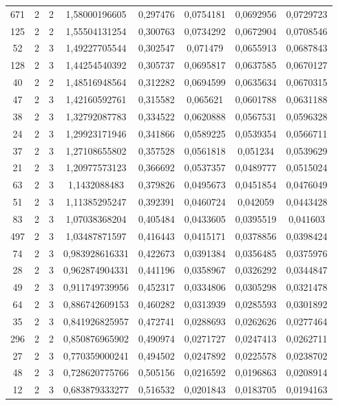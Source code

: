 \begin{longtable}{|c|c|c|c|c|c|c|c|}
671 & 2 & 2 & 1,58000196605 & 0,297476 & 0,0754181 & 0,0692956 & 0,0729723 \\
125 & 2 & 2 & 1,55504131254 & 0,300763 & 0,0734292 & 0,0672904 & 0,0708546 \\
52 & 2 & 3 & 1,49227705544 & 0,302547 & 0,071479 & 0,0655913 & 0,0687843 \\
128 & 2 & 3 & 1,44254540392 & 0,305737 & 0,0695817 & 0,0637585 & 0,0670127 \\
40 & 2 & 2 & 1,48516948564 & 0,312282 & 0,0694599 & 0,0635634 & 0,0670315 \\
47 & 2 & 3 & 1,42160592761 & 0,315582 & 0,065621 & 0,0601788 & 0,0631188 \\
38 & 2 & 3 & 1,32792087783 & 0,334522 & 0,0620888 & 0,0567531 & 0,0596328 \\
24 & 2 & 3 & 1,29923171946 & 0,341866 & 0,0589225 & 0,0539354 & 0,0566711 \\
37 & 2 & 3 & 1,27108655802 & 0,357528 & 0,0561818 & 0,051234 & 0,0539629 \\
21 & 2 & 3 & 1,20977573123 & 0,366692 & 0,0537357 & 0,0489777 & 0,0515024 \\
63 & 2 & 3 & 1,1432088483 & 0,379826 & 0,0495673 & 0,0451854 & 0,0476049 \\
51 & 2 & 3 & 1,11385295247 & 0,392391 & 0,0460724 & 0,042059 & 0,0443428 \\
83 & 2 & 3 & 1,07038368204 & 0,405484 & 0,0433605 & 0,0395519 & 0,041603 \\
497 & 2 & 3 & 1,03487871597 & 0,416443 & 0,0415171 & 0,0378856 & 0,0398424 \\
74 & 2 & 3 & 0,983928616331 & 0,422673 & 0,0391384 & 0,0356485 & 0,0375976 \\
28 & 2 & 3 & 0,962874904331 & 0,441196 & 0,0358967 & 0,0326292 & 0,0344847 \\
49 & 2 & 3 & 0,911749739956 & 0,452317 & 0,0334806 & 0,0305298 & 0,0321478 \\
64 & 2 & 3 & 0,886742609153 & 0,460282 & 0,0313939 & 0,0285593 & 0,0301892 \\
35 & 2 & 3 & 0,841926825957 & 0,472741 & 0,0288693 & 0,0262626 & 0,0277464 \\
296 & 2 & 2 & 0,850876965902 & 0,490974 & 0,0271727 & 0,0247413 & 0,0262711 \\
27 & 2 & 3 & 0,770359000241 & 0,494502 & 0,0247892 & 0,0225578 & 0,0238702 \\
48 & 2 & 3 & 0,728620775766 & 0,505156 & 0,0216592 & 0,0196863 & 0,0208914 \\
12 & 2 & 3 & 0,683879333277 & 0,516532 & 0,0201843 & 0,0183705 & 0,0194163 \\

\end{longtable}
